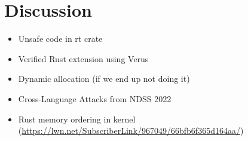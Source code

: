 \section{Discussion}
\begin{itemize}
    \item Unsafe code in rt crate
    \item Verified Rust extension using Verus
    \item Dynamic allocation (if we end up not doing it)
    \item Cross-Language Attacks from NDSS 2022
    \item Rust memory ordering in kernel (\url{https://lwn.net/SubscriberLink/967049/66bfb6f365d164aa/})
\end{itemize}